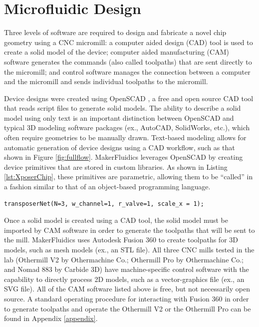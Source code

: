 \section{Microfluidic Design}
\label{sec:mfDesign}

Three levels of software are required to design and fabricate a novel chip geometry using a CNC micromill: a computer aided design (CAD) tool is used to create a solid model of the device; computer aided manufacturing (CAM) software generates the commands (also called toolpaths) that are sent directly to the micromill; and control software manages the connection between a computer and the micromill and sends individual toolpaths to the micromill. 

Device designs were created using OpenSCAD \cite{wikiOpenScad}, a free and open source CAD tool that reads script files to generate solid models. The ability to describe a solid model using only text is an important distinction between OpenSCAD and typical 3D modeling software packages (ex., AutoCAD, SolidWorks, etc.), which often require geometries to be manually drawn. Text-based modeling allows for automatic generation of device designs using a CAD workflow, such as that shown in Figure \ref{fig:fullflow}. MakerFluidics leverages OpenSCAD by creating device primitives that are stored in custom libraries. As shown in Listing \ref{lst:XposerChip}, these primitives are parametric, allowing them to be ``called'' in a fashion similar to that of an object-based programming language. 

\begin{minipage}{0.95\linewidth}
\centering 
	\begin{lstlisting}[caption={This single line of OpenSCAD creates the 3D model shown in Figure \ref{fig:mfParams}(A). Once a primitive is defined in OpenSCAD, the parameters associated with each device geometry can be modified and the corresponding solid model will adjust to reflect the changes.},label={lst:XposerChip}, frame=single, language=scad]
  transposerNet(N=3, w_channel=1, r_valve=1, scale_x = 1);
\end{lstlisting}
\end{minipage}

Once a solid model is created using a CAD tool, the solid model must be imported by CAM software in order to generate the toolpaths that will be sent to the mill. MakerFluidics uses Autodesk Fusion 360 to create toolpaths for 3D models, such as mesh models (ex., an STL file). All three CNC mills tested in the lab (Othermill V2 by Othermachine Co.; Othermill Pro by Othermachine Co.; and Nomad 883 by Carbide 3D) have machine-specific control software with the capability to directly process 2D models, such as a vector-graphics file (ex., an SVG file). All of the CAM software listed above is free, but not necessarily open source. A standard operating procedure for interacting with Fusion 360 in order to generate toolpaths and operate the Othermill V2 or the Othermill Pro can be found in Appendix \ref{appendix}.


